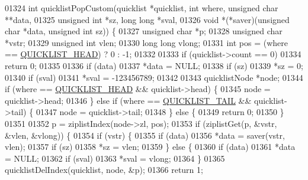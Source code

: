 \begin{DoxyCode}
{{{{{{{{{{01324 \textcolor{keywordtype}{int} quicklistPopCustom(quicklist *quicklist, \textcolor{keywordtype}{int} where, \textcolor{keywordtype}{unsigned} \textcolor{keywordtype}{char} **data,
01325                        \textcolor{keywordtype}{unsigned} \textcolor{keywordtype}{int} *sz, \textcolor{keywordtype}{long} \textcolor{keywordtype}{long} *sval,
01326                        \textcolor{keywordtype}{void} *(*saver)(\textcolor{keywordtype}{unsigned} \textcolor{keywordtype}{char} *data, \textcolor{keywordtype}{unsigned} \textcolor{keywordtype}{int} sz)) \{
01327     \textcolor{keywordtype}{unsigned} \textcolor{keywordtype}{char} *p;
01328     \textcolor{keywordtype}{unsigned} \textcolor{keywordtype}{char} *vstr;
01329     \textcolor{keywordtype}{unsigned} \textcolor{keywordtype}{int} vlen;
01330     \textcolor{keywordtype}{long} \textcolor{keywordtype}{long} vlong;
01331     \textcolor{keywordtype}{int} pos = (where == \hyperlink{quicklist_8h_a4cbe05838d62e8d1c8bfa46c9f1b083a}{QUICKLIST\_HEAD}) ? 0 : -1;
01332 
01333     \textcolor{keywordflow}{if} (quicklist->count == 0)
01334         \textcolor{keywordflow}{return} 0;
01335 
01336     \textcolor{keywordflow}{if} (data)
01337         *data = NULL;
01338     \textcolor{keywordflow}{if} (sz)
01339         *sz = 0;
01340     \textcolor{keywordflow}{if} (sval)
01341         *sval = -123456789;
01342 
01343     quicklistNode *node;
01344     \textcolor{keywordflow}{if} (where == \hyperlink{quicklist_8h_a4cbe05838d62e8d1c8bfa46c9f1b083a}{QUICKLIST\_HEAD} && quicklist->head) \{
01345         node = quicklist->head;
01346     \} \textcolor{keywordflow}{else} \textcolor{keywordflow}{if} (where == \hyperlink{quicklist_8h_a602bad1be3a6abb2a66ef87387cb7698}{QUICKLIST\_TAIL} && quicklist->tail) \{
01347         node = quicklist->tail;
01348     \} \textcolor{keywordflow}{else} \{
01349         \textcolor{keywordflow}{return} 0;
01350     \}
01351 
01352     p = ziplistIndex(node->zl, pos);
01353     \textcolor{keywordflow}{if} (ziplistGet(p, &vstr, &vlen, &vlong)) \{
01354         \textcolor{keywordflow}{if} (vstr) \{
01355             \textcolor{keywordflow}{if} (data)
01356                 *data = saver(vstr, vlen);
01357             \textcolor{keywordflow}{if} (sz)
01358                 *sz = vlen;
01359         \} \textcolor{keywordflow}{else} \{
01360             \textcolor{keywordflow}{if} (data)
01361                 *data = NULL;
01362             \textcolor{keywordflow}{if} (sval)
01363                 *sval = vlong;
01364         \}
01365         quicklistDelIndex(quicklist, node, &p);
01366         \textcolor{keywordflow}{return} 1;
}}}}}}}}}}
\end{DoxyCode}
